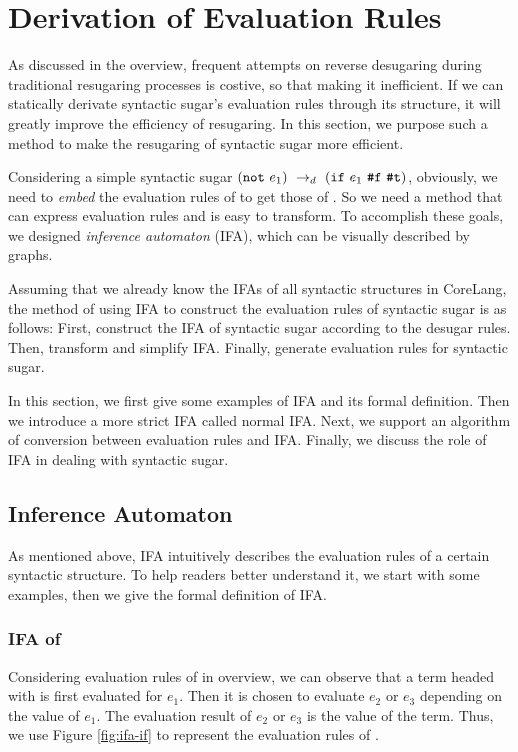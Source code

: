 \section{Derivation of Evaluation Rules}
\label{sec:ruleDerivation}

As discussed in the overview, frequent attempts on reverse desugaring during traditional resugaring processes is costive, so that making it inefficient. If we can statically derivate syntactic sugar's evaluation rules through its structure, it will greatly improve the efficiency of resugaring. In this section, we purpose such a method to make the resugaring of syntactic sugar more efficient.

Considering a simple syntactic sugar $(\mbox{\tt not}~e_1) ~\rightarrow_d~ (\mbox{\tt if}~e_1~\mbox{\tt \#f}~\mbox{\tt \#t})$, obviously, we need to \textit{embed} the evaluation rules of  to get those of . So we need a method that can express evaluation rules and is easy to transform. To accomplish these goals, we designed \textit{inference automaton} (IFA), which can be visually described by graphs.

Assuming that we already know the IFAs of all syntactic structures in CoreLang, the method of using IFA to construct the evaluation rules of syntactic sugar is as follows: First, construct the IFA of syntactic sugar according to the desugar rules. Then, transform and simplify IFA. Finally, generate evaluation rules for syntactic sugar.

In this section, we first give some examples of IFA and its formal definition. Then we introduce a more strict IFA called normal IFA. Next, we support an algorithm of conversion between evaluation rules and IFA. Finally, we discuss the role of IFA in dealing with syntactic sugar.

\subsection{Inference Automaton}

As mentioned above, IFA intuitively describes the evaluation rules of a certain syntactic structure. To help readers better understand it, we start with some examples, then we give the formal definition of IFA.

\subsubsection{IFA of }

Considering evaluation rules of  in overview, we can observe that a term headed with  is first evaluated for $e_1$. Then it is chosen to evaluate $e_2$ or $e_3$ depending on the value of $e_1$. The evaluation result of $e_2$ or $e_3$ is the value of the term. Thus, we use Figure \ref{fig:ifa-if} to represent the evaluation rules of .

